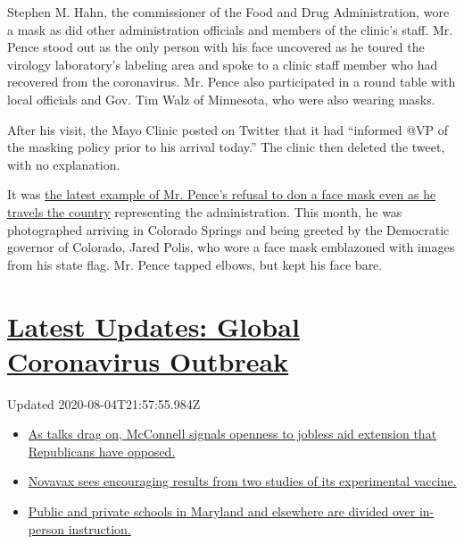 Stephen M. Hahn, the commissioner of the Food and Drug Administration,
wore a mask as did other administration officials and members of the
clinic's staff. Mr. Pence stood out as the only person with his face
uncovered as he toured the virology laboratory's labeling area and spoke
to a clinic staff member who had recovered from the coronavirus. Mr.
Pence also participated in a round table with local officials and Gov.
Tim Walz of Minnesota, who were also wearing masks.

After his visit, the Mayo Clinic posted on Twitter that it had
``informed @VP of the masking policy prior to his arrival today.'' The
clinic then deleted the tweet, with no explanation.

It was
\href{https://www.nytimes3xbfgragh.onion/2020/04/22/us/politics/coronavirus-masks.html}{the
latest example of Mr. Pence's refusal to don a face mask even as he
travels the country} representing the administration. This month, he was
photographed arriving in Colorado Springs and being greeted by the
Democratic governor of Colorado, Jared Polis, who wore a face mask
emblazoned with images from his state flag. Mr. Pence tapped elbows, but
kept his face bare.

\hypertarget{latest-updates-global-coronavirus-outbreak}{%
\section{\texorpdfstring{\href{https://www.nytimes3xbfgragh.onion/2020/08/04/world/coronavirus-cases.html?action=click\&pgtype=Article\&state=default\&region=MAIN_CONTENT_1\&context=storylines_live_updates}{Latest
Updates: Global Coronavirus
Outbreak}}{Latest Updates: Global Coronavirus Outbreak}}\label{latest-updates-global-coronavirus-outbreak}}

Updated 2020-08-04T21:57:55.984Z

\begin{itemize}
\tightlist
\item
  \href{https://www.nytimes3xbfgragh.onion/2020/08/04/world/coronavirus-cases.html?action=click\&pgtype=Article\&state=default\&region=MAIN_CONTENT_1\&context=storylines_live_updates\#link-2daa96b5}{As
  talks drag on, McConnell signals openness to jobless aid extension
  that Republicans have opposed.}
\item
  \href{https://www.nytimes3xbfgragh.onion/2020/08/04/world/coronavirus-cases.html?action=click\&pgtype=Article\&state=default\&region=MAIN_CONTENT_1\&context=storylines_live_updates\#link-1228a480}{Novavax
  sees encouraging results from two studies of its experimental
  vaccine.}
\item
  \href{https://www.nytimes3xbfgragh.onion/2020/08/04/world/coronavirus-cases.html?action=click\&pgtype=Article\&state=default\&region=MAIN_CONTENT_1\&context=storylines_live_updates\#link-4825b93}{Public
  and private schools in Maryland and elsewhere are divided over
  in-person instruction.}
\end{itemize}

